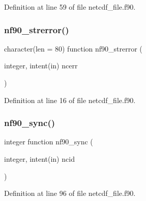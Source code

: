 Definition at line 59 of file netcdf\+\_\+file.\+f90.

\mbox{\label{netcdf__file_8f90_aa6681acb041e6d3ae5c83c1646039729}} 
\subsubsection{\texorpdfstring{nf90\+\_\+strerror()}{nf90\_strerror()}}
{\footnotesize\ttfamily character(len = 80) function nf90\+\_\+strerror (\begin{DoxyParamCaption}\item[{integer, intent(in)}]{ncerr }\end{DoxyParamCaption})}



Definition at line 16 of file netcdf\+\_\+file.\+f90.

\mbox{\label{netcdf__file_8f90_a033641c2ed47b960ec72f0606b848c74}} 
\subsubsection{\texorpdfstring{nf90\+\_\+sync()}{nf90\_sync()}}
{\footnotesize\ttfamily integer function nf90\+\_\+sync (\begin{DoxyParamCaption}\item[{integer, intent(in)}]{ncid }\end{DoxyParamCaption})}



Definition at line 96 of file netcdf\+\_\+file.\+f90.

